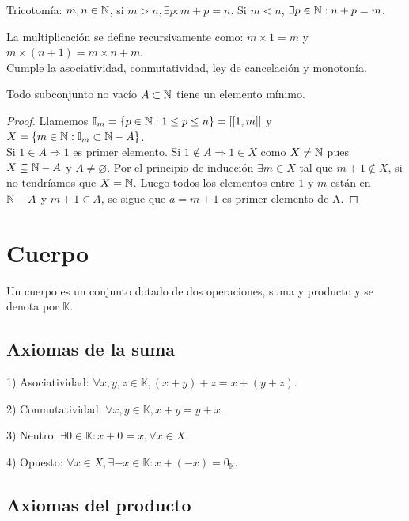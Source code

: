 \begin{prop}
    Tricotomía: $m,n \in \mathbb{N}$, si $m > n, \exists p:m+p=n$. Si $m < n$,  $\exists p \in \mathbb{N} :n+p=m$.
\end{prop}

\begin{definition}
    La multiplicación se define recursivamente como: $m \times 1 =m$ y $m \times (n+1) = m \times n + m$. \\
    Cumple la asociatividad, conmutatividad, ley de cancelación y monotonía.
\end{definition}

\begin{theorem}
    Todo subconjunto no vacío $A \subset \mathbb{N}$ tiene un elemento mínimo.
    \begin{proof}
        Llamemos $\mathbb{I}_m = \{ p \in \mathbb{N} : 1 \leq p \leq n \} = [[ 1, m ]]$ y $X = \{ m \in \mathbb{N} : \mathbb{I}_m \subset \mathbb{N} - A \}$. \\
        Si $1 \in A \Rightarrow 1$ es primer elemento.
        Si $1 \notin A \Rightarrow 1 \in X$ como $X \neq \mathbb{N}$ pues $X \subseteq \mathbb{N} - A$ y $A \neq \varnothing$.
        Por el principio de inducción $\exists m \in X$ tal que $m+1 \notin X$, si no tendríamos que $X = \mathbb{N}$. Luego todos los elementos entre $1$ y $m$ están en $\mathbb{N} - A$ y $m+1 \in A$, se sigue que $a = m+1$ es primer elemento de A.
    \end{proof}
\end{theorem}


\section{Cuerpo}

Un cuerpo es un conjunto dotado de dos operaciones, suma y producto y se denota por $\mathbb{K}$.

\subsection{Axiomas de la suma}

1) Asociatividad: $\forall x,y,z \in \mathbb{K}, (x+y)+z=x+(y+z)$.

2) Conmutatividad: $\forall x,y \in \mathbb{K}, x+y=y+x$.

3) Neutro: $\exists 0 \in \mathbb{K} :x+0 = x, \forall x \in X$.

4) Opuesto: $\forall x \in X, \exists -x \in \mathbb{K} : x +(-x) = 0_\mathbb{K}$.

\subsection{Axiomas del producto}

